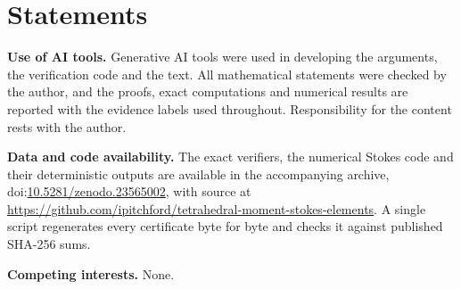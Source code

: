\documentclass[11pt,a4paper]{article}
\theoremstyle{definition}
\theoremstyle{remark}
\begin{document}
\section*{Statements}

\noindent\textbf{Use of AI tools.} Generative AI tools were used in developing
the arguments, the verification code and the text. All mathematical statements
were checked by the author, and the proofs, exact computations and numerical
results are reported with the evidence labels used throughout. Responsibility
for the content rests with the author.

\noindent\textbf{Data and code availability.} The exact verifiers, the
numerical Stokes code and their deterministic outputs are available in the
accompanying archive, doi:\href{https://doi.org/10.5281/zenodo.23565002}{10.5281/zenodo.23565002}, with source at \url{https://github.com/ipitchford/tetrahedral-moment-stokes-elements}. A single script
regenerates every certificate byte for byte and checks it against published
SHA-256 sums.

\noindent\textbf{Competing interests.} None.
\end{document}
